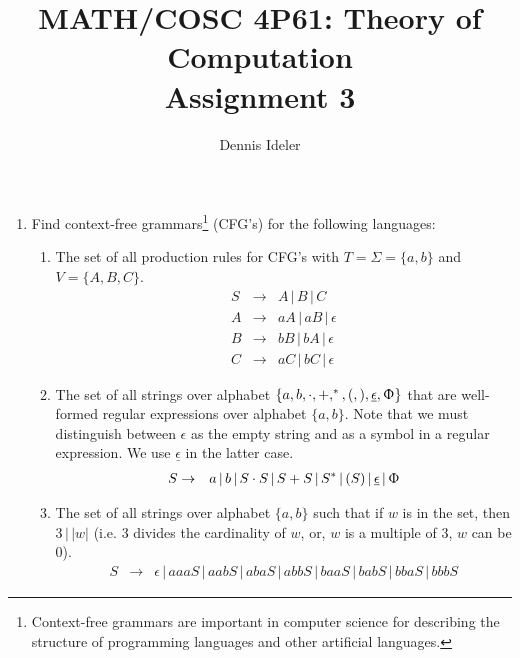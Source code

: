 \documentclass[10pt,a4paper,final]{article}
\author{Dennis Ideler}
\title{MATH/COSC 4P61: Theory of Computation\\Assignment 3}
\begin{document}
\maketitle

\begin{enumerate}
\item %
Find context-free grammars\footnote{Context-free grammars are important in computer science
for describing the structure of programming languages and other artificial languages.}
(CFG's) for the following languages:
\begin{enumerate}
  \item %
  The set of all production rules for CFG's with $T = \Sigma = \{a,b\}$ and $V = \{A,B,C\}$.
  \begin{eqnarray*}
  S &\rightarrow& A \,|\, B \,|\, C \\
  A &\rightarrow& aA \,|\, aB \,|\, \epsilon \\ %
  B &\rightarrow& bB \,|\, bA \,|\, \epsilon \\
  C &\rightarrow& aC \,|\, bC \,|\, \epsilon
  \end{eqnarray*}
  
  \item %
  The set of all strings over alphabet $\{a,b,\cdot,+,^*,(,),\underline{\epsilon},\Upphi\}$
  that are well-formed regular expressions over alphabet $\{a,b\}$. Note that we must distinguish
  between $\epsilon$ as the empty string and as a symbol in a regular expression. We use
  $\underline{\epsilon}$ in the latter case.
  \begin{eqnarray*}
  S &\rightarrow& a \,|\, b \,|\, S \cdot S \,|\, S + S \,|\, S^* \,|\, (S) \,|\,
   \underline{\epsilon} \,|\, \Upphi
  \end{eqnarray*}
  
  \item %
  The set of all strings over alphabet $\{a,b\}$ such that if $w$ is in the set, then $3\,|\,|w|$
  (i.e. 3 divides the cardinality of $w$, or, $w$ is a multiple of 3, $w$ can be 0).
  \begin{eqnarray*}
  S &\rightarrow& \epsilon \,|\, aaaS \,|\, aabS \,|\, abaS \,|\, abbS \,|\, baaS \,|\, babS \,|\,
   bbaS \,|\, bbbS
  \end{eqnarray*}
  

\end{enumerate}
\end{enumerate}
\end{document}
